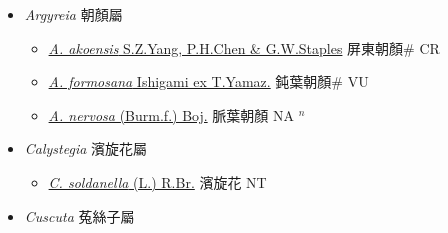 
  \begin{itemize}
 \item[] \textit{Argyreia} 朝顏屬
                    
  \begin{itemize}
        \item[] \href{http://www.theplantlist.org/tpl1.1/search?q=Argyreia+akoensis}{\textit{A. akoensis} S.Z.Yang, P.H.Chen \& G.W.Staples}   屏東朝顏\# CR
        \item[] \href{http://www.theplantlist.org/tpl1.1/search?q=Argyreia+formosana}{\textit{A. formosana} Ishigami ex T.Yamaz.}   鈍葉朝顏\# VU
        \item[] \href{http://www.theplantlist.org/tpl1.1/search?q=Argyreia+nervosa}{\textit{A. nervosa} (Burm.f.) Boj.}   脈葉朝顏 NA $^n$
  \end{itemize}
 \item[] \textit{Calystegia} 濱旋花屬
                    
  \begin{itemize}
        \item[] \href{http://www.theplantlist.org/tpl1.1/search?q=Calystegia+soldanella}{\textit{C. soldanella} (L.) R.Br.}   濱旋花 NT
  \end{itemize}
 \item[] \textit{Cuscuta} 菟絲子屬
                    

\end{itemize}
